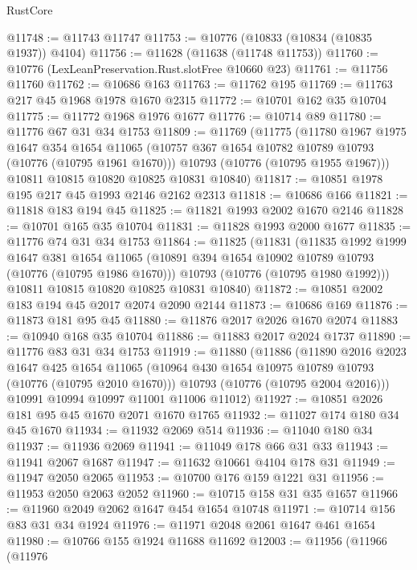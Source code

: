 \begin{lexlean}{RustCore}
\begin{coremodule}
@11748 := @11743 @11747
@11753 := @10776 (@10833 (@10834 (@10835 @1937)) @4104)
@11756 := @11628 (@11638 (@11748 @11753))
@11760 := @10776 (LexLeanPreservation.Rust.slotFree @10660 @23)
@11761 := @11756 @11760
@11762 := @10686 @163
@11763 := @11762 @195
@11769 := @11763 @217 @45 @1968 @1978 @1670 @2315
@11772 := @10701 @162 @35 @10704
@11775 := @11772 @1968 @1976 @1677
@11776 := @10714 @89
@11780 := @11776 @67 @31 @34 @1753
@11809 := @11769
    (@11775
      (@11780
        @1967
        @1975
        @1647
        @354
        @1654
        @11065
        (@10757 @367 @1654 @10782 @10789 @10793 (@10776 (@10795 @1961 @1670)))
        @10793
        (@10776 (@10795 @1955 @1967)))
      @10811
      @10815
      @10820
      @10825
      @10831
      @10840)
@11817 := @10851 @1978 @195 @217 @45 @1993 @2146 @2162 @2313
@11818 := @10686 @166
@11821 := @11818 @183 @194 @45
@11825 := @11821 @1993 @2002 @1670 @2146
@11828 := @10701 @165 @35 @10704
@11831 := @11828 @1993 @2000 @1677
@11835 := @11776 @74 @31 @34 @1753
@11864 := @11825
    (@11831
      (@11835
        @1992
        @1999
        @1647
        @381
        @1654
        @11065
        (@10891 @394 @1654 @10902 @10789 @10793 (@10776 (@10795 @1986 @1670)))
        @10793
        (@10776 (@10795 @1980 @1992)))
      @10811
      @10815
      @10820
      @10825
      @10831
      @10840)
@11872 := @10851 @2002 @183 @194 @45 @2017 @2074 @2090 @2144
@11873 := @10686 @169
@11876 := @11873 @181 @95 @45
@11880 := @11876 @2017 @2026 @1670 @2074
@11883 := @10940 @168 @35 @10704
@11886 := @11883 @2017 @2024 @1737
@11890 := @11776 @83 @31 @34 @1753
@11919 := @11880
    (@11886
      (@11890
        @2016
        @2023
        @1647
        @425
        @1654
        @11065
        (@10964 @430 @1654 @10975 @10789 @10793 (@10776 (@10795 @2010 @1670)))
        @10793
        (@10776 (@10795 @2004 @2016)))
      @10991
      @10994
      @10997
      @11001
      @11006
      @11012)
@11927 := @10851 @2026 @181 @95 @45 @1670 @2071 @1670 @1765
@11932 := @11027 @174 @180 @34 @45 @1670
@11934 := @11932 @2069 @514
@11936 := @11040 @180 @34
@11937 := @11936 @2069
@11941 := @11049 @178 @66 @31 @33
@11943 := @11941 @2067 @1687
@11947 := @11632 @10661 @4104 @178 @31
@11949 := @11947 @2050 @2065
@11953 := @10700 @176 @159 @1221 @31
@11956 := @11953 @2050 @2063 @2052
@11960 := @10715 @158 @31 @35 @1657
@11966 := @11960 @2049 @2062 @1647 @454 @1654 @10748
@11971 := @10714 @156 @83 @31 @34 @1924
@11976 := @11971 @2048 @2061 @1647 @461 @1654
@11980 := @10766 @155 @1924 @11688 @11692
@12003 := @11956
    (@11966
      (@11976

\end{coremodule}
\end{lexlean}
